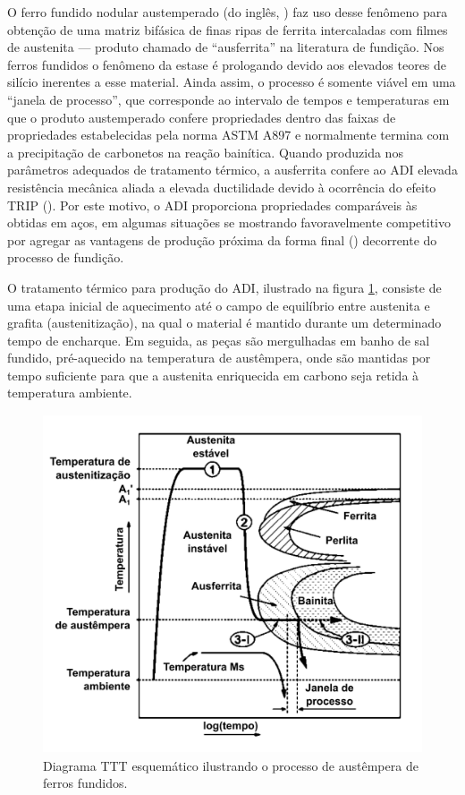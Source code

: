 O ferro fundido nodular austemperado (do inglês, ) faz uso desse fenômeno para obtenção de uma matriz bifásica de finas ripas de ferrita intercaladas com filmes de austenita --- produto chamado de ``ausferrita'' na literatura de fundição. Nos ferros fundidos o fenômeno da estase é prologando devido aos elevados teores de silício inerentes a esse material. Ainda assim, o processo é somente viável em uma ``janela de processo'', que corresponde ao intervalo de tempos e temperaturas em que o produto austemperado confere propriedades dentro das faixas de propriedades estabelecidas pela norma ASTM A897\cite{Bayati1999,ASTMA8972006} e normalmente termina com a precipitação de carbonetos na reação bainítica. Quando produzida nos parâmetros adequados de tratamento térmico, a ausferrita confere ao ADI elevada resistência mecânica aliada a elevada ductilidade devido à ocorrência do efeito TRIP ()\cite{Goldenstein2002}. Por este motivo, o ADI proporciona propriedades comparáveis às obtidas em aços, em algumas situações se mostrando favoravelmente competitivo por agregar as vantagens de produção próxima da forma final () decorrente do processo de fundição\cite{Trudel1997,Hayrynen2002}.

O tratamento térmico para produção do ADI, ilustrado na figura \ref{fig:austempera}, consiste de uma etapa inicial de aquecimento até o campo de equilíbrio entre austenita e grafita (austenitização), na qual o material é mantido durante um determinado tempo de encharque. Em seguida, as peças são mergulhadas em banho de sal fundido, pré-aquecido na temperatura de austêmpera, onde são mantidas por tempo suficiente para que a austenita enriquecida em carbono seja retida à temperatura ambiente\cite{Trudel1997}.

\begin{figure}
	\includegraphics[height=10cm]{img/austemperaTTT_Meier.pdf}
	\caption{Diagrama TTT esquemático ilustrando o processo de austêmpera de ferros fundidos\cite{Meier2013a}.}
	\label{fig:austempera}
\end{figure}

